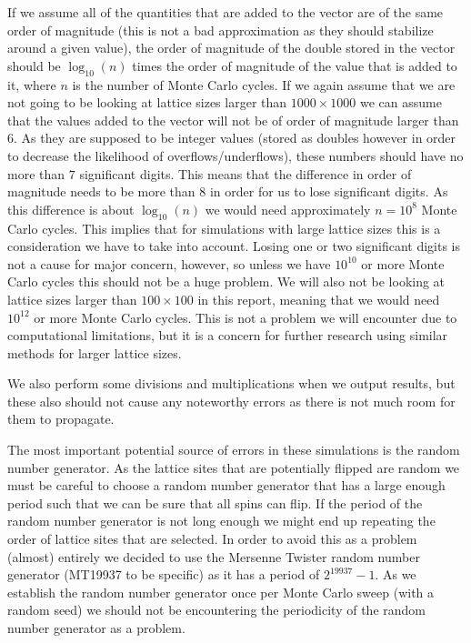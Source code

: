 \documentclass[reprint,english,notitlepage]{revtex4-1}  %
\begin{document}
If we assume all of the quantities that are added to the vector are of the same order of magnitude (this is not a bad approximation as they should stabilize around a given value), the order of magnitude of the double stored in the vector should be $\log_{10}(n)$ times the order of magnitude of the value that is added to it, where $n$ is the number of Monte Carlo cycles. If we again assume that we are not going to be looking at lattice sizes larger than $1000\times 1000$ we can assume that the values added to the vector will not be of order of magnitude larger than $6$. As they are supposed to be integer values (stored as doubles however in order to decrease the likelihood of overflows/underflows), these numbers should have no more than $7$ significant digits. This means that the difference in order of magnitude needs to be more than $8$ in order for us to lose significant digits. As this difference is about $\log_{10}(n)$ we would need approximately $n=10^8$ Monte Carlo cycles. This implies that for simulations with large lattice sizes this is a consideration we have to take into account. Losing one or two significant digits is not a cause for major concern, however, so unless we have $10^{10}$ or more Monte Carlo cycles this should not be a huge problem. We will also not be looking at lattice sizes larger than $100 \times 100$ in this report, meaning that we would need $10^{12}$ or more Monte Carlo cycles. This is not a problem we will encounter due to computational limitations, but it is a concern for further research using similar methods for larger lattice sizes.
      
We also perform some divisions and multiplications when we output results, but these also should not cause any noteworthy errors as there is not much room for them to propagate. 

The most important potential source of errors in these simulations is the random number generator. As the lattice sites that are potentially flipped are random we must be careful to choose a random number generator that has a large enough period such that we can be sure that all spins can flip. If the period of the random number generator is not long enough we might end up repeating the order of lattice sites that are selected. In order to avoid this as a problem (almost) entirely we decided to use the Mersenne Twister random number generator \citep{MersenneTwister} (MT19937 to be specific) as it has a period of $2^{19937}-1$. As we establish the random number generator once per Monte Carlo sweep (with a random seed) we should not be encountering the periodicity of the random number generator as a problem.
\end{document}
